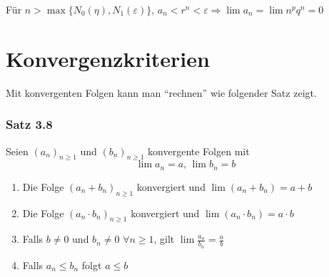 \noindent Für $n>\max\{N_0\left(\eta\right), N_1(\varepsilon)\}$, $a_n<r^n<\varepsilon \Rightarrow \lim a_n=\lim n^pq^n=0$

\section{Konvergenzkriterien}
Mit konvergenten Folgen kann man ``rechnen'' wie folgender Satz zeigt.
\subsubsection*{Satz 3.8}
Seien $\left( a_n\right)_{n\geq 1}$ und $\left( b_n\right)_{n\geq 1}$ konvergente Folgen mit
\[\lim a_n=a\text{, }\lim b_n=b\]
\begin{enumerate}[\hspace{2mm}i)]
\item Die Folge $\left( a_n+b_n\right)_{n\geq 1}$ konvergiert und $\lim\left( a_n+b_n\right)=a+b$
\item Die Folge $\left( a_n\cdot b_n\right)_{n\geq 1}$ konvergiert und $\lim\left( a_n\cdot b_n\right)=a\cdot b$
\item Falls $b\not=0$ und $b_n\not=0$ $\forall n\geq 1$, gilt $\lim\frac{a_n}{b_n}=\frac{a}{b}$
\item Falls $a_n\leq b_n$ folgt $a\leq b$
\end{enumerate}

